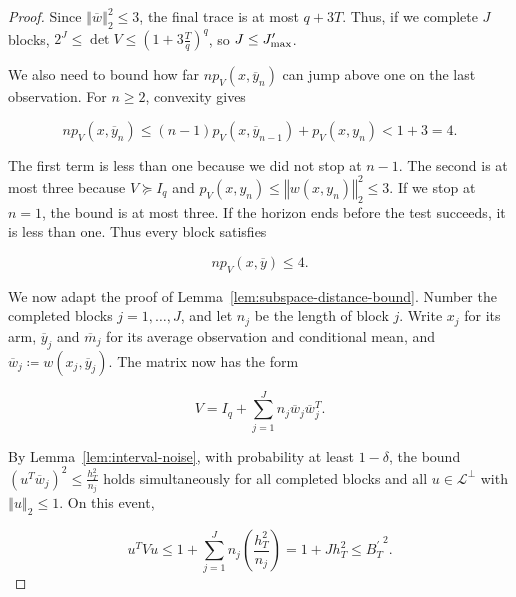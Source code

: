 {{\begin{proof}
Since ${\left\Vert \overline{w} \right\Vert}_{2}^{2} \le 3$, the final trace is at most $q + 3 T$.
Thus, if we complete $J$ blocks,
$2^{J} \le \operatorname{det} V \le {\left( 1 + 3 \frac{T}{q} \right)}^{q}$, so $J \le J_{\text{\normalfont max}}^{\prime}$.

We also need to bound how far $n p_{V} \left( x , {\overline{y}}_{n} \right)$ can jump above
one on the last observation. For $n \ge 2$, convexity gives


\begin{equation*}
n p_{V} \left( x , {\overline{y}}_{n} \right) \le \left( n - 1 \right) p_{V} \left( x , {\overline{y}}_{n - 1} \right) + p_{V} \left( x , y_{n} \right) < 1 + 3 = 4 .
\end{equation*}


The first term is less than one because we did not stop at $n - 1$.
The second is at most three because $V \succeq I_{q}$ and
$p_{V} \left( x , y_{n} \right) \le {\left\Vert w \left( x , y_{n} \right) \right\Vert}_{2}^{2} \le 3$. If we stop at $n = 1$, the bound is
at most three. If the horizon ends before the test succeeds, it is less
than one. Thus every block satisfies



\begin{equation}
n p_{V} \left( x , \overline{y} \right) \le 4 .\label{eq:soft-block-cost}
\end{equation}



We now adapt the proof of Lemma~\ref{lem:subspace-distance-bound}. Number the
completed blocks $j = 1 , \ldots , J$, and let $n_{j}$ be the length of block $j$. Write $x_{j}$
for its arm, ${\overline{y}}_{j}$ and ${\overline{m}}_{j}$ for its average
observation and conditional mean, and
${\overline{w}}_{j} \coloneqq w \left( x_{j} , {\overline{y}}_{j} \right)$. The matrix now has the form


\begin{equation*}
V = I_{q} + \sum_{j = 1}^{J} n_{j} {\overline{w}}_{j} {\overline{w}}_{j}^{T} .
\end{equation*}


By Lemma~\ref{lem:interval-noise}, with probability at least $1 - \delta$, the bound
${\left( u^{T} {\overline{w}}_{j} \right)}^{2} \le \frac{h_{T}^{2}}{n_{j}}$ holds simultaneously for all completed
blocks and all $u \in {\mathcal{L}}^{\perp}$ with ${\left\Vert u \right\Vert}_{2} \le 1$. On this event,


\begin{equation*}
u^{T} V u \le 1 + \sum_{j = 1}^{J} n_{j} \left( \frac{h_{T}^{2}}{n_{j}} \right) = 1 + J h_{T}^{2} \le {B_{T}^{\prime}}^{2} .
\end{equation*}



\end{proof}}}
